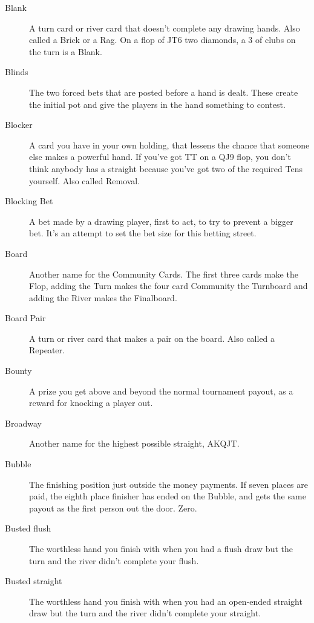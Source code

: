 \begin{description}
\item[Blank] A turn card or river card that doesn't complete any
drawing hands. Also called a Brick or a Rag. On a flop of JT6 two
diamonds, a 3 of clubs on the turn is a Blank.

\item[Blinds] The two forced bets that are posted before a hand is
dealt. These create the initial pot and give the players in the hand
something to contest.

\item[Blocker] A card you have in your own holding, that lessens
the chance that someone else makes a powerful hand. If you've got TT
on a QJ9 flop, you don't think anybody has a straight because you've
got two of the required Tens yourself. Also called Removal.

\item[Blocking Bet] A bet made by a drawing player, first to act,
to try to prevent a bigger bet. It's an attempt to set the bet size
for this betting street.

\item[Board] Another name for the Community Cards. The first three
cards make the Flop, adding the Turn makes the four card Community the
Turnboard and adding the River makes the Finalboard.

\item[Board Pair] A turn or river card that makes a pair on the
board. Also called a Repeater.

\item[Bounty] A prize you get above and beyond the normal tournament
payout, as a reward for knocking a player out.

\item[Broadway] Another name for the highest possible straight, AKQJT.

\item[Bubble] The finishing position just outside the money payments.
If seven places are paid, the eighth place finisher has ended on the
Bubble, and gets the same payout as the first person out the door. Zero.

\item[Busted flush] The worthless hand you finish with when you had a
flush draw but the turn and the river didn't complete your flush.

\item[Busted straight] The worthless hand you finish with when you had
an open-ended straight draw but the turn and the river didn't complete
your straight.


\end{description}
